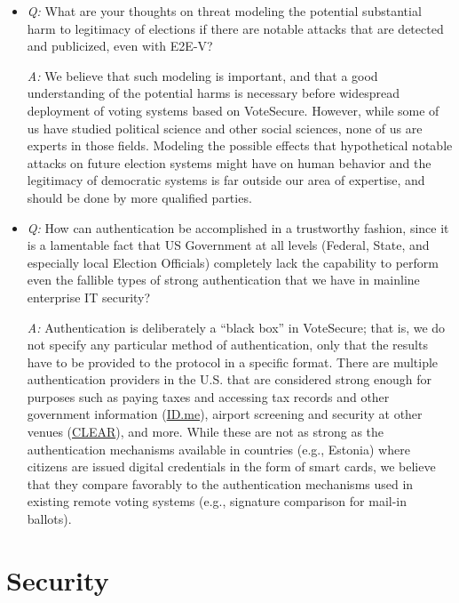 \documentclass[12pt,letter]{article}
\begin{document}
\begin{itemize}
    \item \emph{Q:} What are your thoughts on threat modeling the potential substantial harm to legitimacy of elections if there are notable attacks that are detected and publicized, even with E2E-V?

    \emph{A:} We believe that such modeling is important, and that a good understanding of the potential harms is necessary before widespread deployment of voting systems based on VoteSecure. However, while some of us have studied political science and other social sciences, none of us are experts in those fields. Modeling the possible effects that hypothetical notable attacks on future election systems might have on human behavior and the legitimacy of democratic systems is far outside our area of expertise, and should be done by more qualified parties.

    \item \emph{Q:} How can authentication be accomplished in a trustworthy fashion, since it is a lamentable fact that US Government at all levels (Federal, State, and especially local Election Officials) completely lack the capability to perform even the fallible types of strong authentication that we have in mainline enterprise IT security?

    \emph{A:} Authentication is deliberately a ``black box'' in VoteSecure; that is, we do not specify any particular method of authentication, only that the results have to be provided to the protocol in a specific format. There are multiple authentication providers in the U.S. that are considered strong enough for purposes such as paying taxes and accessing tax records and other government information (\href{https://id.me}{ID.me}), airport screening and security at other venues (\href{https://clearme.com}{CLEAR}), and more. While these are not as strong as the authentication mechanisms available in countries (e.g., Estonia) where citizens are issued digital credentials in the form of smart cards, we believe that they compare favorably to the authentication mechanisms used in existing remote voting systems (e.g., signature comparison for mail-in ballots).

\end{itemize}

\section{Security}
\end{document}

